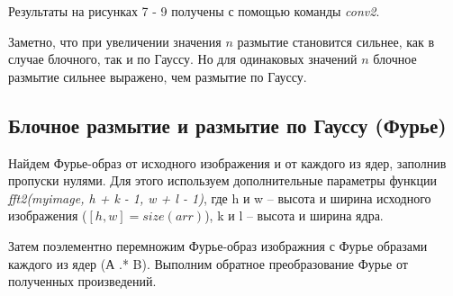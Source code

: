 \documentclass[a5paper, 10pt]{article}
\theoremstyle{definition}
\theoremstyle{plain}
\theoremstyle{remark}
\begin{document}
\newpage
Результаты на рисунках 7 - 9 получены с помощью команды \textit{conv2}. 

Заметно, что при увеличении значения $n$ размытие становится сильнее, как в случае блочного, так и по Гауссу. Но для одинаковых значений $n$ блочное размытие сильнее выражено, чем размытие по Гауссу.


\subsection{Блочное размытие и размытие по Гауссу (Фурье)}

Найдем Фурье-образ от исходного изображения и от каждого из ядер, заполнив пропуски нулями. Для этого используем дополнительные параметры функции \textit{fft2(myimage, h + k - 1, w + l - 1)}, где h и w -- высота и ширина исходного изображения ($[h, w] = size(arr)$), k и l -- высота и ширина ядра.

Затем поэлементно перемножим Фурье-образ изображния с Фурье образами каждого из ядер (А .* B). Выполним обратное преобразование Фурье от полученных произведений.
\end{document}
